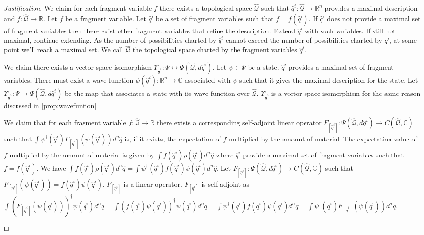 \documentclass[smallextended]{svjour3}
\numberwithin{equation}{section}
\newenvironment{justification}{\emph{Justification}.}{\hfill\(\qed\)}
\theoremstyle{definition}
\newenvironment{justification}{\emph{Justification}.}{\qed}
\begin{document}
\begin{justification}
	We claim for each fragment variable $f$ there exists a topological space $\hat{\mathcal{Q}}$ such that  $\hat{q}^i : \hat{\mathcal{Q}} \rightarrow \mathbb{R}^n$ provides a maximal description and $f : \hat{\mathcal{Q}} \rightarrow \mathbb{R}$. Let $f$ be a fragment variable. Let $\hat{q}^i$ be a set of fragment variables such that $f=f(\hat{q}^i)$. If $\hat{q}^i$ does not provide a maximal set of fragment variables then there exist other fragment variables that refine the description. Extend $\hat{q}^i$ with such variables. If still not maximal, continue extending. As the number of possibilities charted by $\hat{q}^i$ cannot exceed the number of possibilities charted by $q^i$, at some point we'll reach a maximal set. We call $\hat{\mathcal{Q}}$ the topological space charted by the fragment variables $\hat{q}^i$.
	
	We claim there exists a vector space isomorphism $\Upsilon_{\hat{\mathcal{q}}^i} : \Psi \leftrightarrow \Psi(\hat{\mathcal{Q}}, d\hat{q}^i)$. Let $\psi \in \Psi$ be a state. $\hat{q}^i$ provides a maximal set of fragment variables. There must exist a wave function $\psi(\hat{q}^i) : \mathbb{R}^n \rightarrow \mathbb{C}$ associated with $\psi$ such that it gives the maximal description for the state. Let $\Upsilon_{\hat{\mathcal{q}}^i} : \Psi \rightarrow \Psi(\hat{\mathcal{Q}}, d\hat{q}^i)$ be the map that associates a state with its wave function over $\hat{\mathcal{Q}}$. $\Upsilon_{\hat{\mathcal{q}}^i}$ is a vector space isomorphism for the same reason discussed in \ref{prop:wavefuntion}
	
	We claim that for each fragment variable $f : \hat{\mathcal{Q}} \rightarrow \mathbb{R}$ there exists a corresponding self-adjoint linear operator $F_{[\hat{q}^i]} : \Psi(\hat{\mathcal{Q}}, d\hat{q}^i) \rightarrow C(\hat{\mathcal{Q}}, \mathbb{C})$ such that $\int \psi^\dagger(\hat{q}^i) F_{[\hat{q}^i]}( \psi(\hat{q}^i)) d^n \hat{q}$ is, if it exists, the expectation of $f$ multiplied by the amount of material. The expectation value of $f$ multiplied by the amount of material is given by $\int f(\hat{q}^i) \rho(\hat{q}^i) d^n\hat{q}$ where $\hat{q}^i$ provide a maximal set of fragment variables such that $f=f(\hat{q}^i)$. We have $\int f(\hat{q}^i) \rho(\hat{q}^i) d^n\hat{q} = \int \psi^\dagger(\hat{q}^i) f(\hat{q}^i) \psi(\hat{q}^i) d^{n}\hat{q}$. Let $F_{[\hat{q}^i]} : \Psi(\hat{\mathcal{Q}}, d\hat{q}^i) \rightarrow C(\hat{\mathcal{Q}}, \mathbb{C})$ such that $F_{[\hat{q}^i]} (\psi(\hat{q}^i)) = f(\hat{q}^i) \psi(\hat{q}^i)$. $F_{[\hat{q}^i]}$ is a linear operator. $F_{[\hat{q}^i]}$ is self-adjoint as $\int (F_{[\hat{q}^i]}(\psi(\hat{q}^i)))^\dagger \psi(\hat{q}^i) d^{n}\hat{q} = \int (f(\hat{q}^i) \psi(\hat{q}^i))^\dagger \psi(\hat{q}^i) d^{n}\hat{q} = \int \psi^\dagger(\hat{q}^i) f(\hat{q}^i) \psi(\hat{q}^i) d^{n}\hat{q} = \int \psi^\dagger(\hat{q}^i) F_{[\hat{q}^i]} (\psi(\hat{q}^i)) d^{n}\hat{q}$.
		

\end{justification}
\end{document}
